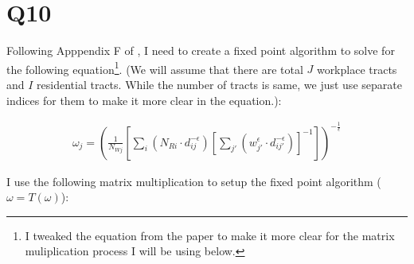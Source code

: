 \documentclass[
  11pt]{article}
\begin{document}
\section*{Q10}\label{q10}

Following Apppendix F of \citet{brinkman2024}, I need to create a fixed
point algorithm to solve for the following equation\footnote{I tweaked
  the equation from the paper to make it more clear for the matrix
  muliplication process I will be using below.}. (We will assume that
there are total \(J\) workplace tracts and \(I\) residential tracts.
While the number of tracts is same, we just use separate indices for
them to make it more clear in the equation.):

\begin{align*}
  \omega_j = \left( \frac{1}{N_{Wj}} \left[\sum_i \left( N_{Ri} \cdot d_{ij}^{-\epsilon}\right) \left[\sum_{j'} \left( w_{j'}^\epsilon \cdot d_{ij'}^{-\epsilon} \right)\right]^{-1}\right] \right)^{-\frac{1}{\epsilon}}
\end{align*}

I use the following matrix multiplication to setup the fixed point
algorithm (\(\omega = T(\omega)\)):
\end{document}
